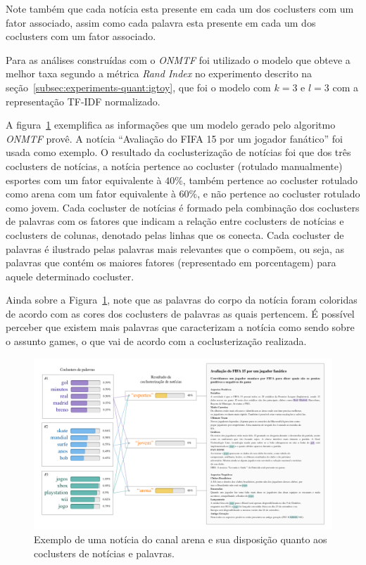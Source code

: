 \documentclass[
    12pt,                %
    oneside,            %
    a4paper,            %
    english,            %
    brazil                %
    ]{abntex2ppgsi}
\begin{document}
Note também que cada notícia esta presente em cada um dos coclusters com um fator associado, assim como cada palavra esta presente em cada um dos coclusters com um fator associado.

Para as análises construídas com o \textit{ONMTF} foi utilizado o modelo que obteve a melhor taxa segundo a métrica \textit{Rand Index} no experimento descrito na seção~\ref{subsec:experiments-quant:igtoy}, que foi o modelo com $k = 3$ e $l = 3$ com a representação TF-IDF normalizado.

A figura~\ref{fig:analysis-onmtf} exemplifica as informações que um modelo gerado pelo algoritmo \textit{ONMTF} provê.
A notícia ``Avaliação do FIFA 15 por um jogador fanático'' foi usada como exemplo.
O resultado da coclusterização de notícias foi que dos três coclusters de notícias, a notícia pertence ao cocluster (rotulado manualmente) esportes com um fator equivalente à $40\%$, também pertence ao cocluster rotulado como arena com um fator equivalente à $60\%$, e não pertence ao cocluster rotulado como jovem.
Cada cocluster de notícias é formado pela combinação dos coclusters de palavras com os fatores que indicam a relação entre coclusters de notícias e coclusters de colunas, denotado pelas linhas que os conecta.
Cada cocluster de palavras é ilustrado pelas palavras mais relevantes que o compõem, ou seja, as palavras que contém os maiores fatores (representado em porcentagem) para aquele determinado cocluster.

Ainda sobre a Figura~\ref{fig:analysis-onmtf}, note que as palavras do corpo da notícia foram coloridas de acordo com as cores dos coclusters de palavras as quais pertencem.
É possível perceber que existem mais palavras que caracterizam a notícia como sendo sobre o assunto games, o que vai de acordo com a coclusterização realizada.

\begin{figure}[H]
    \centering
    \includegraphics[width=1\textwidth]{img/analysis-onmtf.png}
    \caption{Exemplo de uma notícia do canal arena e sua disposição quanto aos coclusters de notícias e palavras.}
    \label{fig:analysis-onmtf}
\end{figure}
\end{document}
